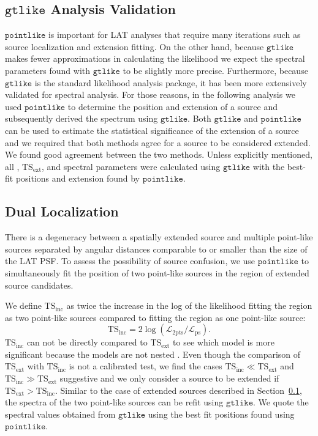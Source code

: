 \documentclass[12pt,preprint]{aastex}
\newcommand{\tsext}{{\ensuremath{\text{TS}_{\text{ext}}}}\xspace}
\newcommand{\tsinc}{\ensuremath{\text{TS}_{\text{inc}}}\xspace}
\newcommand{\likelihood}{\ensuremath{\mathcal{L}}\xspace}
\newcommand{\ts}{\text{TS}\xspace}
\newcommand{\gtlike}{\ensuremath{\mathtt{gtlike}}\xspace}
\newcommand{\pointlike}{\ensuremath{\mathtt{pointlike}}\xspace}
\begin{document}
\subsection{\gtlike Analysis Validation}
\label{gtlike_crosscheck}

\pointlike is important for LAT analyses that require many iterations
such as source localization and extension fitting.  On the other hand,
because \gtlike makes fewer approximations in calculating the likelihood
we expect the spectral parameters found with \gtlike to be slightly more
precise.  Furthermore, because \gtlike is the standard likelihood analysis
package, it has been more extensively validated for spectral analysis.
For those reasons, in the following analysis we used \pointlike to
determine the position and extension of a source and subsequently derived
the spectrum using \gtlike. Both \gtlike and \pointlike can be used to
estimate the statistical significance of the extension of a source and we
required that both methods agree for a source to be considered extended.
We found good agreement between the two methods.  Unless explicitly
mentioned, all \ts, \tsext, and spectral parameters were calculated using
\gtlike with the best-fit positions and extension found by \pointlike.

\subsection{Dual Localization}
\label{dual_localization_method}

There is a degeneracy between a spatially extended source and multiple
point-like  sources separated by angular distances comparable to or smaller than
the size of the LAT PSF.  To assess the possibility of source confusion,
we use \pointlike to simultaneously fit the position of two point-like sources
in the region of extended source candidates.

We define \tsinc as twice the increase in the log of the likelihood fitting the
region as two point-like sources compared to fitting the region as one point-like
source: 
\begin{equation}
  \tsinc=2\log(\likelihood_\text{2pts}/\likelihood_\text{ps}).
\end{equation} 
\tsinc can not be directly compared to \tsext to see which
model is more significant because the models are not nested
\citep{statistics_with_care}. Even though the comparison of \tsext with
\tsinc is not a calibrated test, we find the cases $\tsinc \ll \tsext$
and $\tsinc\gg\tsext$ suggestive and we only consider a source to be
extended if $\tsext>\tsinc$.
Similar to the case of extended sources described in Section~\ref{gtlike_crosscheck},
the spectra of the two point-like sources can be refit using \gtlike.
We quote the spectral values obtained from \gtlike using the best fit
positions found using \pointlike.  
\end{document}
